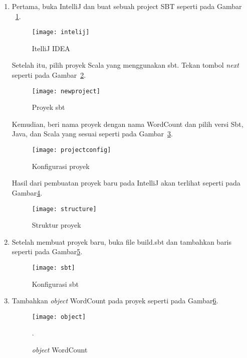 \begin{enumerate}

\item Pertama, buka IntelliJ dan buat sebuah project SBT seperti pada Gambar ~\ref{fig:intelij}.

\begin{figure}[H]
    \centering  
    \texttt{[image: intelij]}  
    \caption[ItelliJ IDEA]{ItelliJ IDEA} 
    \label{fig:intelij} 
\end{figure}

Setelah itu, pilih proyek Scala yang menggunakan sbt. Tekan tombol \textit{next} seperti pada Gambar~\ref{fig:newproject}.

\begin{figure}[H]
    \centering  
    \texttt{[image: newproject]}  
    \caption[Proyek sbt]{Proyek sbt} 
    \label{fig:newproject} 
\end{figure}

Kemudian, beri nama proyek dengan nama WordCount dan pilih versi Sbt, Java, dan Scala yang sesuai seperti pada Gambar~\ref{fig:projectconfig}. 

\begin{figure}[H]
    \centering  
    \texttt{[image: projectconfig]}  
    \caption[Konfigurasi proyek]{Konfigurasi proyek} 
    \label{fig:projectconfig} 
\end{figure}

Hasil dari pembuatan proyek baru pada IntelliJ akan terlihat seperti pada Gambar\ref{fig:structure}.

\begin{figure}[H]
    \centering  
    \texttt{[image: structure]}  
    \caption[Struktur proyek ]{Struktur proyek} 
    \label{fig:structure} 
\end{figure}

\item Setelah membuat proyek baru, buka file build.sbt dan tambahkan baris seperti pada Gambar\ref{fig:sbt}.


\begin{figure}[H]
    \centering  
    \texttt{[image: sbt]}  
    \caption[Konfigurasi sbt]{Konfigurasi sbt} 
    \label{fig:sbt} 
\end{figure}

\item Tambahkan \textit{object} WordCount pada proyek seperti pada Gambar\ref{fig:object}.

\begin{figure}[H]
    \centering  
    \texttt{[image: object]}  
    \caption[\textit{object} WordCount]{\textit{object} WordCount}.
    \label{fig:object} 
\end{figure}



\end{enumerate}
